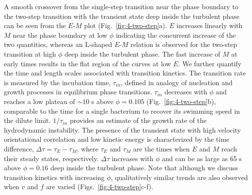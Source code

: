 A smooth crossover from the single-step transition near the phase boundary to the two-step transition with the transient state deep inside the turbulent phase can be seen from the $E$-$M$ plot (Fig.~\ref{fig:4-two-step}a).
$E$ increases linearly with $M$ near the phase boundary at low $\phi$ indicating the concurrent increase of the two quantities, whereas an L-shaped $E$-$M$ relation is observed for the two-step transition at high $\phi$ deep inside the turbulent phase.
The fast increase of $M$ at early times results in the flat region of the curves at low $E$. We further quantify the time and length scales associated with transition kinetics.
The transition rate is measured by the incubation time, $\tau_{in}$, defined in analogy of nucleation and growth processes in equilibrium phase transitions. $\tau_{in}$ decreases with $\phi$ and reaches a low plateau of $\sim 10$ s above $\phi = 0.105$ (Fig.~\ref{fig:4-two-step}b), comparable to the time for a single bacterium to recover its swimming speed in the dilute limit.
$1/\tau_{in}$ provides an estimate of the growth rate of the hydrodynamic instability.
The presence of the transient state with high velocity orientational correlation and low kinetic energy is characterized by the time difference, $\Delta\tau = \tau_E-\tau_M$, where $\tau_E$ and $\tau_M$ are the times when $E$ and $M$ reach their steady states, respectively.
$\Delta\tau$ increases with $\phi$ and can be as large as 65 s above $\phi = 0.16$ deep inside the turbulent phase.
Note that although we discuss transition kinetics with increasing $\phi$, qualitatively similar trends are also observed when $v$ and $f$ are varied (Figs.~\ref{fig:4-two-step}c-f).

